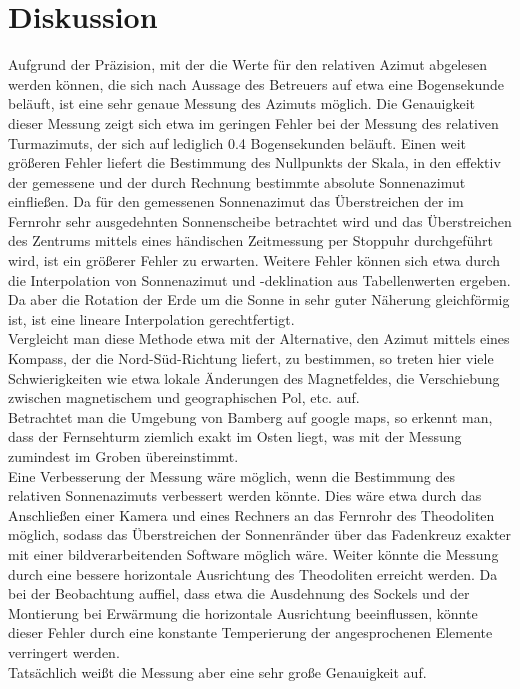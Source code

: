 \section{Diskussion}
Aufgrund der Präzision, mit der die Werte für den relativen Azimut abgelesen werden können, die sich nach Aussage des Betreuers auf etwa eine Bogensekunde beläuft, ist eine sehr genaue Messung des Azimuts möglich. Die Genauigkeit dieser Messung zeigt sich etwa im geringen Fehler bei der Messung des relativen Turmazimuts, der sich auf lediglich 0.4 Bogensekunden beläuft. Einen weit größeren Fehler liefert die Bestimmung des Nullpunkts der Skala, in den effektiv der gemessene und der durch Rechnung bestimmte absolute Sonnenazimut einfließen. Da für den gemessenen Sonnenazimut das Überstreichen der im Fernrohr sehr ausgedehnten Sonnenscheibe betrachtet wird und das Überstreichen des Zentrums mittels eines händischen Zeitmessung per Stoppuhr durchgeführt wird, ist ein größerer Fehler zu erwarten. Weitere Fehler können sich etwa durch die Interpolation von Sonnenazimut und -deklination aus Tabellenwerten ergeben. Da aber die Rotation der Erde um die Sonne in sehr guter Näherung gleichförmig ist, ist eine lineare Interpolation gerechtfertigt. \\
Vergleicht man diese Methode etwa mit der Alternative, den Azimut mittels eines Kompass, der die Nord-Süd-Richtung liefert, zu bestimmen, so treten hier viele Schwierigkeiten wie etwa lokale Änderungen des Magnetfeldes, die Verschiebung zwischen magnetischem und geographischen Pol, etc. auf. \\
Betrachtet man die Umgebung von Bamberg auf google maps, so erkennt man, dass der Fernsehturm ziemlich exakt im Osten liegt, was mit der Messung zumindest im Groben übereinstimmt. \\
Eine Verbesserung der Messung wäre möglich, wenn die Bestimmung des relativen Sonnenazimuts verbessert werden könnte. Dies wäre etwa durch das Anschließen einer Kamera und eines Rechners an das Fernrohr des Theodoliten möglich, sodass das Überstreichen der Sonnenränder über das Fadenkreuz exakter mit einer bildverarbeitenden Software möglich wäre. Weiter könnte die Messung durch eine bessere horizontale Ausrichtung des Theodoliten erreicht werden. Da bei der Beobachtung auffiel, dass etwa die Ausdehnung des Sockels und der Montierung bei Erwärmung die horizontale Ausrichtung beeinflussen, könnte dieser Fehler durch eine konstante Temperierung der angesprochenen Elemente verringert werden. \\
Tatsächlich weißt die Messung aber eine sehr große Genauigkeit auf. 